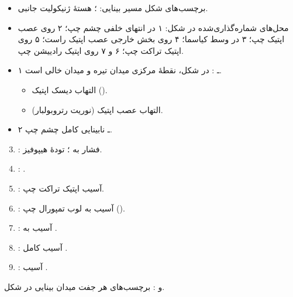 \documentclass[a4paper,12pt]{extbook}
\begin{document}
\begin{center}
\end{center}
\begin{itemize}
\item برچسب‌های شکل مسیر بینایی: ؛ هستهٔ ژنیکولیت جانبی.
\item محل‌های شماره‌گذاری‌شده در شکل: ۱ در انتهای خلفی چشم چپ؛ ۲ روی عصب اپتیک چپ؛ ۳ در وسط کیاسما؛ ۴ روی بخش خارجی عصب اپتیک راست؛ ۵ روی اپتیک تراکت چپ؛ ۶ و ۷ روی اپتیک رادییشن چپ.
\item ۱ ـ : در شکل، نقطهٔ مرکزی میدان  تیره و میدان  خالی است.
  \begin{itemize}
  \item التهاب دیسک اپتیک ().
  \item التهاب عصب اپتیک (نوریت رتروبولبار).
  \end{itemize}
\item ۲ ـ نابینایی کامل چشم چپ.
\end{itemize}

\begin{center}
\end{center}
\begin{enumerate}
\setcounter{enumi}{2}
\item {}: فشار به ؛ تودهٔ هیپوفیز.
\item {}: .
\item {}: آسیب اپتیک تراکت چپ.
\item {}: آسیب به لوب تمپورال چپ ().
\item {}: آسیب به .
\item {}: آسیب کامل .
\item {}: آسیب .
\end{enumerate}
 و : برچسب‌های هر جفت میدان بینایی در شکل.
\end{document}

